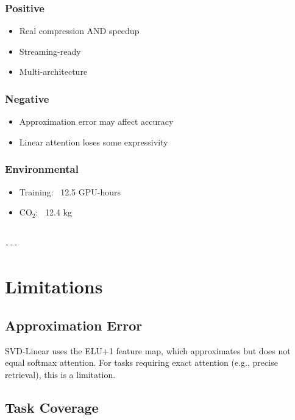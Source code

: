 \subsubsection{Positive}
\begin{itemize}
\item Real compression AND speedup
\item Streaming-ready
\item Multi-architecture

\end{itemize}
\subsubsection{Negative}
\begin{itemize}
\item Approximation error may affect accuracy
\item Linear attention loses some expressivity

\end{itemize}
\subsubsection{Environmental}
\begin{itemize}
\item Training: ~12.5 GPU-hours
\item CO$_2$: ~12.4 kg
\end{itemize}
\begin{lstlisting}

---
\end{lstlisting}


\section{Limitations}

\subsection{Approximation Error}

SVD-Linear uses the ELU+1 feature map, which approximates but does not equal 
softmax attention. For tasks requiring exact attention (e.g., precise 
retrieval), this is a limitation.

\subsection{Task Coverage}

